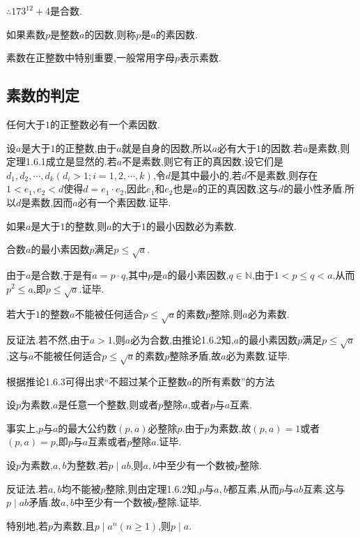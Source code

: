 $\therefore 173^{12}+4$是合数.

\theorem 如果素数$p$是整数$a$的因数,则称$p$是$a$的素因数.

素数在正整数中特别重要,一般常用字母$p$表示素数.

\subsection{素数的判定}
\theorem 任何大于$1$的正整数必有一个素因数.

\proof 设$a$是大于$1$的正整数,由于$a$就是自身的因数,所以$a$必有大于$1$的因数.若$a$是素数,则定理1.6.1成立是显然的.若$a$不是素数,则它有正的真因数,设它们是$d_{1}, d_{2}, \cdots, d_{k}\left(d_{i}>1 ; i=1,2, \cdots, k\right)$,令$d$是其中最小的,若$d$不是素数,则存在$1<e_{1}, e_{2}<d$使得$d=e_{1} \cdot e_{2}$,因此$e_{1}$和$e_{2}$也是$a$的正的真因数,这与$d$的最小性矛盾.所以$d$是素数,因而$a$必有一个素因数.证毕.

\corollary {\color{red}[推论1.6.1]}如果$a$是大于$1$的整数,则$a$的大于$1$的最小因数必为素数.

\corollary {\color{red}[推论1.6.2]}合数$a$的最小素因数$p$满足$p \leqslant \sqrt{a}$.

\proof 由于$a$是合数,于是有$a=p \cdot q$,其中$p$是$a$的最小素因数,$q \in \mathbb{N}$,由于$1<p \leqslant q<a$,从而 $p^{2} \leqslant a$,即$p \leqslant \sqrt{a}$.证毕.

\corollary {\color{red}[推论1.6.3]}若大于$1$的整数$a$不能被任何适合$p \leqslant \sqrt{a}$的素数$p$整除,则$a$必为素数.

\proof 反证法.若不然,由于$a>1$,则$a$必为合数,由推论1.6.2知,$a$的最小素因数$p$满足$p \leqslant \sqrt{a}$,这与$a$不能被任何适合$p \leqslant \sqrt{a}$的素数$p$整除矛盾,故$a$必为素数.证毕.

\remark 根据推论1.6.3可得出求“不超过某个正整数$a$的所有素数”的方法

\theorem {\color{red}[定理1.6.2]}设$p$为素数,$a$是任意一个整数,则或者$p$整除$a$,或者$p$与$a$互素.

\proof 事实上,$p$与$a$的最大公约数$(p, a)$必整除$p$.由于$p$为素数,故$(p, a)=1$或者$(p, a)=p$,即$p$与$a$互素或者$p$整除$a$.证毕.

\theorem {\color{red}[定理1.6.3]}设$p$为素数,$a, b$为整数,若$p \mid a b$,则$a, b$中至少有一个数被$p$整除.

\proof 反证法.若$a, b$均不能被$p$整除,则由定理1.6.2知,$p$与$a, b$都互素,从而$p$与$a b$互素.这与$p \mid a b$矛盾.故$a, b$中至少有一个数被$p$整除.证毕.

特别地,若$p$为素数,且$p \mid a^{n}(n \geqslant 1)$,则$p \mid a$.

